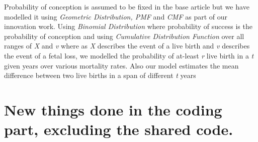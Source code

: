 \documentclass{article}
\begin{document}
Probability of conception is assumed to be fixed in the base article but we have modelled it using {\slshape Geometric Distribution, PMF} and {\slshape CMF} as part of our innovation work. Using {\slshape Binomial Distribution} where probability of success is the probability of conception and using {\slshape Cumulative Distribution Function} over all ranges of {\slshape X} and {\slshape v} where as {\slshape X} describes the event of a live birth and {\slshape v} describes the event of a fetal loss, we modelled the probability of at-least {\slshape r} live birth in a {\slshape t} given years over various mortality rates. Also our model estimates the mean difference between two live births in a span of different {\slshape t} years
\section{New things done in the coding part, excluding the shared code.}
\end{document}
